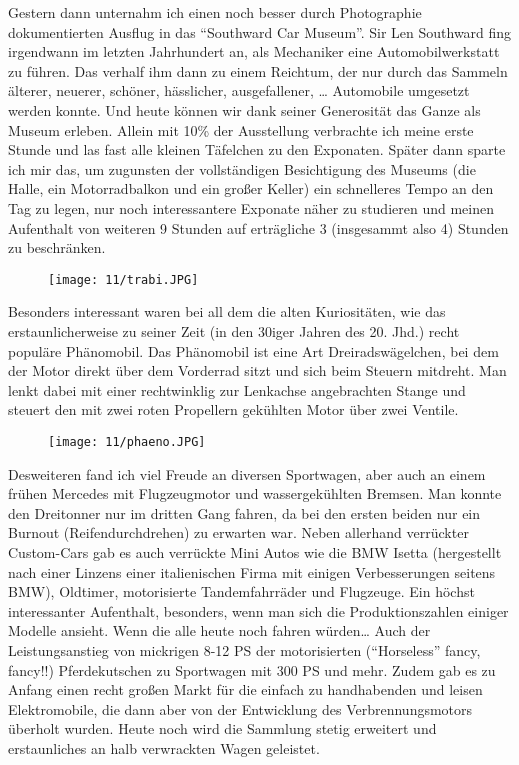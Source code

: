 Gestern dann unternahm ich einen noch besser durch Photographie
dokumentierten Ausflug in das ``Southward Car Museum''. Sir Len Southward
fing irgendwann im letzten Jahrhundert an, als Mechaniker eine
Automobilwerkstatt zu führen. Das verhalf ihm dann zu einem Reichtum,
der nur durch das Sammeln älterer, neuerer, schöner, hässlicher,
ausgefallener, \ldots{} Automobile umgesetzt werden konnte. Und heute
können wir dank seiner Generosität das Ganze als Museum erleben. Allein
mit 10\% der Ausstellung verbrachte ich meine erste Stunde und las fast
alle kleinen Täfelchen zu den Exponaten. Später dann sparte ich mir das,
um zugunsten der vollständigen Besichtigung des Museums (die Halle, ein
Motorradbalkon und ein großer Keller) ein schnelleres Tempo an den Tag
zu legen, nur noch interessantere Exponate näher zu studieren und meinen
Aufenthalt von weiteren 9 Stunden auf erträgliche 3 (insgesammt also 4)
Stunden zu beschränken.

\begin{figure}[h]
  \centering
  \texttt{[image: 11/trabi.JPG]}
\end{figure}

Besonders interessant waren bei all dem die alten Kuriositäten, wie das
erstaunlicherweise zu seiner Zeit (in den 30iger Jahren des 20. Jhd.)
recht populäre Phänomobil. Das Phänomobil ist eine Art
Dreiradswägelchen, bei dem der Motor direkt über dem Vorderrad sitzt und
sich beim Steuern mitdreht. Man lenkt dabei mit einer rechtwinklig zur
Lenkachse angebrachten Stange und steuert den mit zwei roten Propellern
gekühlten Motor über zwei Ventile.
\begin{figure}[h]
  \centering
  \texttt{[image: 11/phaeno.JPG]}
\end{figure}

Desweiteren fand ich viel Freude an diversen Sportwagen, aber auch an
einem frühen Mercedes mit Flugzeugmotor und wassergekühlten
Bremsen. Man konnte den Dreitonner nur im dritten Gang fahren, da bei
den ersten beiden nur ein Burnout (Reifendurchdrehen) zu erwarten
war. Neben allerhand verrückter Custom-Cars gab es auch verrückte Mini
Autos wie die BMW Isetta (hergestellt nach einer Linzens einer
italienischen Firma mit einigen Verbesserungen seitens BMW), Oldtimer,
motorisierte Tandemfahrräder und Flugzeuge. Ein höchst interessanter
Aufenthalt, besonders, wenn man sich die Produktionszahlen einiger
Modelle ansieht. Wenn die alle heute noch fahren würden\ldots{} Auch
der Leistungsanstieg von mickrigen 8-12 PS der motorisierten
(``Horseless'' fancy, fancy!!) Pferdekutschen zu Sportwagen mit 300 PS
und mehr. Zudem gab es zu Anfang einen recht großen Markt für die
einfach zu handhabenden und leisen Elektromobile, die dann aber von
der Entwicklung des Verbrennungsmotors überholt wurden. Heute noch
wird die Sammlung stetig erweitert und erstaunliches an halb
verwrackten Wagen geleistet.

